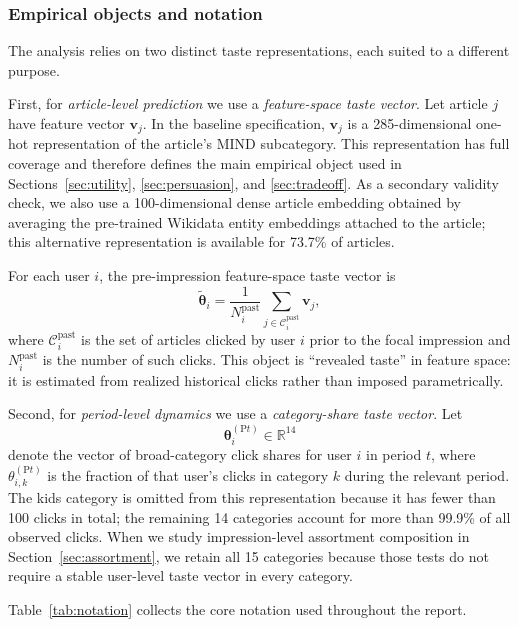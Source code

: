 \documentclass[11pt]{article}
\begin{document}
\subsubsection{Empirical objects and notation}
\label{sec:notation}

The analysis relies on two distinct taste representations, each suited to a different purpose.

First, for \emph{article-level prediction} we use a \emph{feature-space taste vector}. Let article $j$ have feature vector $\mathbf{v}_j$. In the baseline specification, $\mathbf{v}_j$ is a 285-dimensional one-hot representation of the article's MIND subcategory. This representation has full coverage and therefore defines the main empirical object used in Sections~\ref{sec:utility}, \ref{sec:persuasion}, and \ref{sec:tradeoff}. As a secondary validity check, we also use a 100-dimensional dense article embedding obtained by averaging the pre-trained Wikidata entity embeddings attached to the article; this alternative representation is available for 73.7\% of articles.

For each user $i$, the pre-impression feature-space taste vector is
\[
\tilde{\boldsymbol{\theta}}_i=\frac{1}{N_i^{\text{past}}}\sum_{j \in \mathcal{C}_i^{\text{past}}}\mathbf{v}_j,
\]
where $\mathcal{C}_i^{\text{past}}$ is the set of articles clicked by user $i$ prior to the focal impression and $N_i^{\text{past}}$ is the number of such clicks. This object is ``revealed taste'' in feature space: it is estimated from realized historical clicks rather than imposed parametrically.

Second, for \emph{period-level dynamics} we use a \emph{category-share taste vector}. Let
\[
\boldsymbol{\theta}_i^{(\mathrm{P}t)} \in \mathbb{R}^{14}
\]
denote the vector of broad-category click shares for user $i$ in period $t$, where $\theta_{i,k}^{(\mathrm{P}t)}$ is the fraction of that user's clicks in category $k$ during the relevant period. The kids category is omitted from this representation because it has fewer than 100 clicks in total; the remaining 14 categories account for more than 99.9\% of all observed clicks. When we study impression-level assortment composition in Section~\ref{sec:assortment}, we retain all 15 categories because those tests do not require a stable user-level taste vector in every category.

Table~\ref{tab:notation} collects the core notation used throughout the report.
\end{document}
